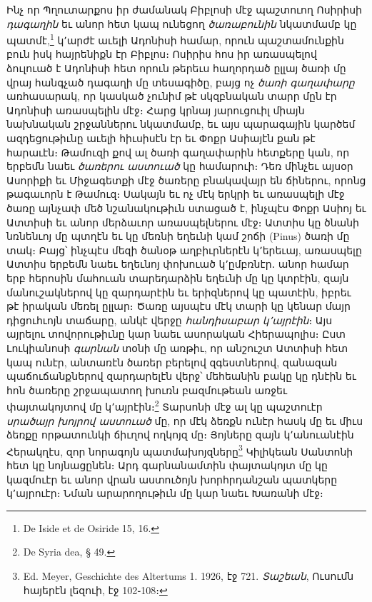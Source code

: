\documentclass{article}
\begin{document}
{Ինչ որ Պղուտարքոս իր ժամանակ Բիբլոսի մէջ պաշտուող Ոսիրիսի \emph{դագաղին} եւ անոր հետ կապ ունեցող \emph{ծառաբունին} նկատմամբ կը պատմէ,\footnote{De Iside et de Osiride 15, 16.} կ՚արժէ աւելի Ադոնիսի համար, որուն պաշտամունքին բուն իսկ հայրենիքն էր Բիբլոս։ Ոսիրիս հոս իր առասպելով ձուլուած է Ադոնիսի հետ որուն թերեւս հաղորդած ըլլայ ծառի մը վրայ հանգչած դագաղի մը տեսագիծը, բայց ոչ \emph{ծառի գաղափարը} առհասարակ, որ կասկած չունիմ թէ սկզբնական տարր մըն էր Ադոնիսի առասպելին մէջ։ Հարց կրնայ յարուցուիլ միայն նախնական շրջաններու նկատմամբ, եւ այս պարագային կարծեմ ազդեցութիւնը աւելի հիւսիսէն էր եւ Փոքր Ասիայէն քան թէ հարաւէն։ Թամուզի քով ալ ծառի գաղափարին հետքերը կան, որ երբեմն նաեւ \emph{ծառերու աստուած} կը համարուի։ Դեռ մինչեւ այսօր Ասորիքի եւ Միջագետքի մէջ ծառերը բնակավայր են ճիներու, որոնց թագաւորն է Թամուզ։ Սակայն եւ ոչ մէկ երկրի եւ առասպելի մէջ ծառը այնչափ մեծ նշանակութիւն ստացած է, ինչպէս Փոքր Ասիոյ եւ Ատտիսի եւ անոր մերձաւոր առասպելներու մէջ։ Ատտիս կը ծնանի նռնենւոյ մը պտղէն եւ կը մեռնի եղեւնի կամ շոճի (Pinus) ծառի մը տակ։ Բայց՝ ինչպէս մեզի ծանօթ աղբիւրներէն կ՚երեւայ, առասպելը Ատտիս երբեմն նաեւ եղեւնոյ փոխուած կ՚ըմբռնէր․ անոր համար երբ հերոսին մահուան տարեդարձին եղեւնի մը կը կտրէին, զայն մանուշակներով կը զարդարէին եւ երիզներով կը պատէին, իբրեւ թէ իրական մեռել ըլլար։ Ծառը այսպէս մէկ տարի կը կենար մայր դիցուհւոյն տաճարը, անկէ վերջը \emph{հանդիսաբար կ՚այրէին}։ Այս այրելու տովորութիւնը կար նաեւ ասորական Հիերապոլիս։ Ըստ Լուկիանոսի \emph{գարնան} տօնի մը առթիւ, որ անշուշտ Ատտիսի հետ կապ ունէր, անտառէն ծառեր բերելով զգեստներով, զանազան պաճուճանքներով զարդարելէն վերջ՝ մեհեանին բակը կը դնէին եւ հոն ծառերը շրջապատող խուռն բազմութեան առջեւ փայտակոյտով մը կ՚այրէին։\footnote{De Syria dea, § 49.} Տարսոնի մէջ ալ կը պաշտուէր \emph{սրածայր խոյրով աստուած} մը, որ մէկ ձեռքն ունէր հասկ մը եւ միւս ձեռքը որթատունկի ճիւղով ողկոյզ մը։ Յոյները զայն կ՚անուանէին Հերակղէս, զոր նորագոյն պատմախոյզները\footnote{Ed. Meyer, Geschichte des Altertums 1. 1926, էջ 721. \emph{Տաշեան}, Ուսումն հայերէն լեզուի, էջ 102֊108։} Կիլիկեան Սանտոնի հետ կը նոյնացընեն։ Արդ գարնանամտին փայտակոյտ մը կը կազմուէր եւ անոր վրան աստուծոյն խորհրդանշան պատկերը կ՚այրուէր։ Նման արարողութիւն մը կար նաեւ Խառանի մէջ։

}
\end{document}
